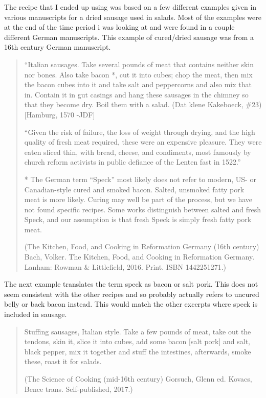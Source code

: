 \documentclass[letterpaper,11pt,leqno]{article}
\begin{document}
The recipe that I ended up using was based on a few different examples given in various manuscripts for a dried sausage used in salads. Most of the examples were at the end of the time period i was looking at and were found in a couple different German manuscripts. This example of cured/dried sausage was from a 16th century German manuscript.

\begin{quote}
	 “Italian sausages.  Take several pounds of meat that contains neither skin nor bones.  Also take bacon *, cut it into cubes; chop the meat, then mix the bacon cubes into it and take salt and peppercorns and also mix that in.  Contain it in gut casings and hang these sausages in the chimney so that they become dry.  Boil them with a salad.  (Dat klene Kakeboeck, \#23)  [Hamburg, 1570 -JDF]
	
	“Given the risk of failure, the loss of weight through drying, and the high quality of fresh meat required, these were an expensive pleasure.  They were eaten sliced thin, with bread, cheese, and condiments, most famously by church reform activists in public defiance of the Lenten fast in 1522.”
	
	* The German term “Speck” most likely does not refer to modern, US- or Canadian-style cured and smoked bacon.  Salted, unsmoked fatty pork meat is more likely.  Curing may well be part of the process, but we have not found specific recipes.  Some works distinguish between salted and fresh Speck, and our assumption is that fresh Speck is simply fresh fatty pork meat.
	
	(The Kitchen, Food, and Cooking in Reformation Germany (16th century)
	Bach, Volker.  The Kitchen, Food, and Cooking in Reformation Germany.  
	Lanham: Rowman \& Littlefield, 2016.  Print.  ISBN 1442251271.)
	
\end{quote}

The next example translates the term speck as bacon or salt pork. This does not seem consistent with the other recipes and so probably actually refers to uncured belly or back bacon instead. This would match the other excerpts where speck is included in sausage.

\begin{quote}
	Stuffing sausages, Italian style. 
	Take a few pounds of meat, take out the tendons, skin it, slice it into cubes, add some bacon [salt pork] and salt, black pepper, mix it together and stuff the intestines, afterwards, smoke these, roast it for salads. 
	
	(The Science of Cooking (mid-16th century) Gorsuch, Glenn ed. Kovacs, Bence trans.  Self-published, 2017.)
\end{quote}
\end{document}

